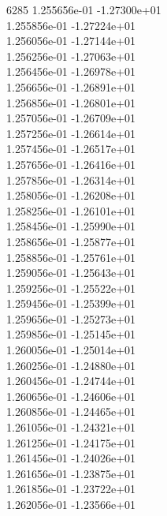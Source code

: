 6285	1.255656e-01	-1.27300e+01	\\ 	1.255856e-01	-1.27224e+01	\\ 	1.256056e-01	-1.27144e+01	\\ 	1.256256e-01	-1.27063e+01	\\ 	1.256456e-01	-1.26978e+01	\\ 	1.256656e-01	-1.26891e+01	\\ 	1.256856e-01	-1.26801e+01	\\ 	1.257056e-01	-1.26709e+01	\\ 	1.257256e-01	-1.26614e+01	\\ 	1.257456e-01	-1.26517e+01	\\ 	1.257656e-01	-1.26416e+01	\\ 	1.257856e-01	-1.26314e+01	\\ 	1.258056e-01	-1.26208e+01	\\ 	1.258256e-01	-1.26101e+01	\\ 	1.258456e-01	-1.25990e+01	\\ 	1.258656e-01	-1.25877e+01	\\ 	1.258856e-01	-1.25761e+01	\\ 	1.259056e-01	-1.25643e+01	\\ 	1.259256e-01	-1.25522e+01	\\ 	1.259456e-01	-1.25399e+01	\\ 	1.259656e-01	-1.25273e+01	\\ 	1.259856e-01	-1.25145e+01	\\ 	1.260056e-01	-1.25014e+01	\\ 	1.260256e-01	-1.24880e+01	\\ 	1.260456e-01	-1.24744e+01	\\ 	1.260656e-01	-1.24606e+01	\\ 	1.260856e-01	-1.24465e+01	\\ 	1.261056e-01	-1.24321e+01	\\ 	1.261256e-01	-1.24175e+01	\\ 	1.261456e-01	-1.24026e+01	\\ 	1.261656e-01	-1.23875e+01	\\ 	1.261856e-01	-1.23722e+01	\\ 	1.262056e-01	-1.23566e+01	\\ \hline
